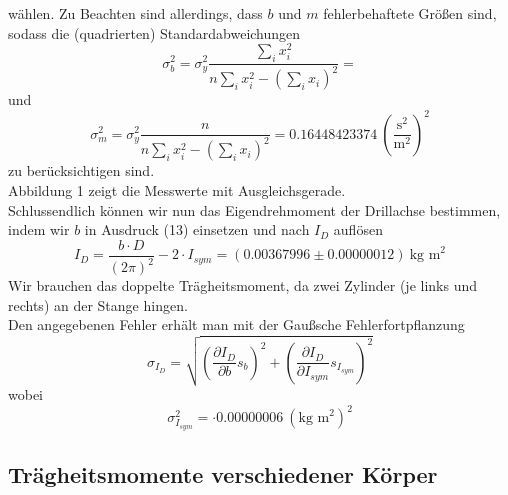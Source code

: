 wählen. Zu Beachten sind allerdings, dass $b$ und $m$ fehlerbehaftete Größen sind, sodass die (quadrierten) Standardabweichungen
\begin{equation}
	\sigma_b^2 = \sigma_y^2\frac{\sum_ix_i^2}{n\sum_ix_i^2-\left(\sum_ix_i\right)^2} =
\end{equation}
und
\begin{equation}
	\sigma_m^2 = \sigma_y^2\frac{n}{n\sum_ix_i^2-\left(\sum_ix_i\right)^2} = 0.16448423374\ \left(\frac{\text{s}^2}{\text{m}^2}\right)^2
\end{equation}
zu berücksichtigen sind. \\
Abbildung 1 zeigt die Messwerte mit Ausgleichsgerade. \\
Schlussendlich können wir nun das Eigendrehmoment der Drillachse bestimmen, indem wir $b$ in Ausdruck (13) einsetzen und nach $I_D$ auflösen
\begin{equation}
	I_D = \frac{b\cdot D}{(2\pi)^2} - 2\cdot I_{sym} = (0.00367996 \pm 0.00000012)\ \text{kg\ m}^2
\end{equation}
Wir brauchen das doppelte Trägheitsmoment, da zwei Zylinder (je links und rechts) an der Stange hingen. \\
Den angegebenen Fehler erhält man mit der Gaußsche Fehlerfortpflanzung
\begin{equation}
	\sigma_{I_D} = \sqrt{\left(\frac{\partial I_D}{\partial b}s_b\right)^2+\left(\frac{\partial I_D}{\partial I_{sym}}s_{I_{sym}}\right)^2}
\end{equation}
wobei
\begin{equation}
	\sigma_{I_{sym}}^2 = \cdot0.00000006 \ (\text{kg\ m}^2)^2
\end{equation}
\subsection{Trägheitsmomente verschiedener Körper}

